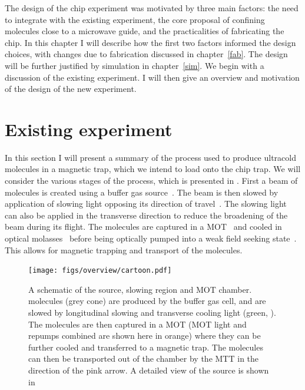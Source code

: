 The design of the \CaF{} chip experiment was motivated by three main factors:
the need to integrate with the existing experiment, the core proposal of
confining molecules close to a microwave guide, and the practicalities of
fabricating the chip. In this chapter I will describe how the first two factors
informed the design choices, with changes due to fabrication discussed in
chapter~\ref{fab}. The design will be further justified by simulation in
chapter~\ref{sim}.
%
We begin with a discussion of the existing experiment. I will then give an
overview and motivation of the design of the new experiment.


\section{Existing \CaF{} experiment}

In this section I will present a summary of the process used to produce
ultracold \CaF{} molecules in a magnetic trap, which we intend to load onto the
chip trap. We will consider the various stages of the process, which is
presented in . First a beam of \CaF{}
molecules is created using a buffer gas
source~\cite{Truppe2018}. The beam is then slowed by
application of slowing light opposing its direction of
travel~\cite{Truppe2017a}. The slowing light can also be applied in the
transverse direction to reduce the broadening of the beam during its flight.
The molecules are captured in a MOT~\cite{Williams2017} and cooled in optical
molasses~\cite{Truppe2017} before being optically pumped into a weak field
seeking state~\cite{WilliamsMagnetic2018}. This allows for magnetic trapping
and transport of the molecules.

\begin{figure}
  \centering
  \texttt{[image: figs/overview/cartoon.pdf]}
  \caption{A schematic of the \CaF{} source, slowing region and MOT chamber.
  \CaF{} molecules (grey cone) are produced by the buffer gas cell, and are
  slowed by longitudinal slowing and transverse cooling light (green,
  ). The molecules are then captured in a MOT (MOT light
   and repumps combined are shown here in orange) where
  they can be further cooled and transferred to a magnetic trap. The molecules
  can then be transported out of the chamber by the MTT in the direction of the
  pink arrow. A detailed view of the source is shown in
  }
  \label{overview:fig:CaFcartoon}
\end{figure}

